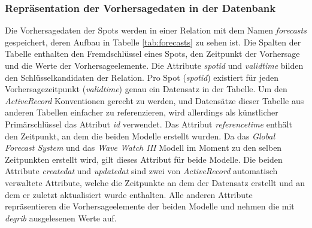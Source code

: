 \subsubsection{Repräsentation der Vorhersagedaten in der Datenbank}
Die Vorhersagedaten der Spots werden in einer Relation mit dem Namen
\textit{forecasts} gespeichert, deren Aufbau in Tabelle
\ref{tab:forecasts} zu sehen ist. Die Spalten der Tabelle enthalten
den Fremdschlüssel eines Spots, den Zeitpunkt der Vorhersage und die
Werte der Vorhersageelemente. Die Attribute
\textit{spot\textunderscore id} und \textit{valid\textunderscore time}
bilden den Schlüsselkandidaten der Relation. Pro Spot
(\textit{spot\textunderscore id}) existiert für jeden
Vorhersagezeitpunkt (\textit{valid\textunderscore time}) genau ein
Datensatz in der Tabelle. Um den \textit{ActiveRecord} Konventionen
gerecht zu werden, und Datensätze dieser Tabelle aus anderen Tabellen
einfacher zu referenzieren, wird allerdings als künstlicher
Primärschlüssel das Attribut \textit{id} verwendet. Das Attribut
\textit{reference\textunderscore time} enthält den Zeitpunkt, an dem
die beiden Modelle erstellt wurden. Da das \textit{Global Forecast
  System} und das \textit{Wave Watch III} Modell im Moment zu den
selben Zeitpunkten erstellt wird, gilt dieses Attribut für beide
Modelle. Die beiden Attribute \textit{created\textunderscore at} und
\textit{updated\textunderscore at} sind zwei von \textit{ActiveRecord}
automatisch verwaltete Attribute, welche die Zeitpunkte an dem der
Datensatz erstellt und an dem er zuletzt aktualisiert wurde
enthalten. Alle anderen Attribute repräsentieren die
Vorhersageelemente der beiden Modelle und nehmen die mit
\textit{degrib} ausgelesenen Werte auf.

